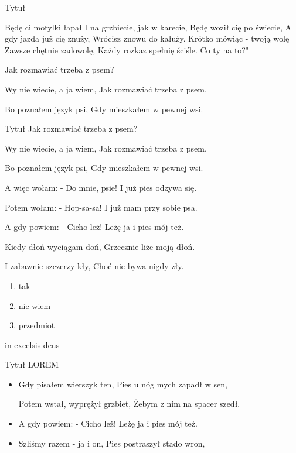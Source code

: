 \documentclass{beamer}
\begin{document}
\begin{frame}{Tytuł}



Będę ci motylki łapał
I na grzbiecie, jak w karecie,
Będę woził cię po świecie,
A gdy jazda już cię znuży,
Wrócisz znowu do kałuży.
Krótko mówiąc - twoją wolę
Zawsze chętnie zadowolę,
Każdy rozkaz spełnię ściśle.
Co ty na to?"

\begin{figure}
   
   
    \label{fig:Pies rozumie, bo ja wiem,
Jak rozmawiać trzeba z psem.
.}
\end{figure}
 Jak rozmawiać trzeba z psem?

Wy nie wiecie, a ja wiem,
Jak rozmawiać trzeba z psem,

Bo poznałem język psi,
Gdy mieszkałem w pewnej wsi.
\end{frame}
\begin{frame}{Tytuł}
Jak rozmawiać trzeba z psem?

Wy nie wiecie, a ja wiem,
Jak rozmawiać trzeba z psem,

Bo poznałem język psi,
Gdy mieszkałem w pewnej wsi.

A więc wołam: - Do mnie, psie!
I już pies odzywa się.

Potem wołam: - Hop-sa-sa!
I już mam przy sobie psa.

A gdy powiem: - Cicho leż!
Leżę ja i pies mój też.

Kiedy dłoń wyciągam doń,
Grzecznie liże moją dłoń.

I zabawnie szczerzy kły,
Choć nie bywa nigdy zły.


 \begin{enumerate}
  \item tak
  \pause
  \item nie wiem 
  \pause
  \item przedmiot
  \pause
\end{enumerate} in excelsis deus 
\end{frame}
\begin{frame}{Tytuł}
LOREM
\begin{itemize}
  \item Gdy pisałem wierszyk ten,
Pies u nóg mych zapadł w sen,

Potem wstał, wyprężył grzbiet,
Żebym z nim na spacer szedł.
  \pause
  \item A gdy powiem: - Cicho leż!
Leżę ja i pies mój też.

  \pause
  \item Szliśmy razem - ja i on,
Pies postraszył stado wron,

\end{itemize}
\begin{figure}
   

   
    \label{fig:A gdy powiem: - Cicho leż!
Leżę ja i pies mój też.}
\end{figure}
\end{frame}
\end{document}
